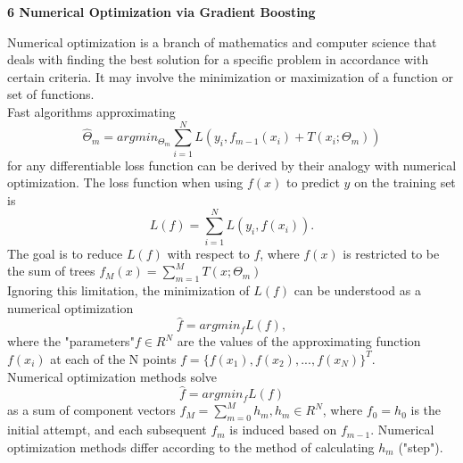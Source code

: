 \documentclass[12pt, letterpaper, twoside]{article}
\begin{document}
\begin{center}
\textbf{\large{6 Numerical Optimization via Gradient
Boosting}} 

\end{center}
\hspace*{4ex}Numerical optimization is a branch of mathematics and computer science that deals with finding the best solution for a specific problem in accordance with certain criteria. It may involve the minimization or maximization of a function or set of functions.\\
\hspace*{4ex}Fast algorithms approximating 
\begin{equation*}
\hat{\Theta}_{m}=argmin_{\Theta_{m}}\sum_{i=1}^N L(y_i,f_{m-1}(x_i)+T(x_i;\Theta_m))
\end{equation*}
for any differentiable loss function can be derived by their analogy with numerical optimization. The loss function when using $f(x)$ to predict $y$ on the training set is
\begin{equation*}
L(f)=\sum_{i=1}^N L(y_i,f(x_i)).
\end{equation*}
The goal is to reduce $L(f)$ with respect to $f$, where $f(x)$ is restricted to be the sum of trees $f_M(x)=\sum _{m=1}^M T(x;\Theta_m)$\\
\hspace*{4ex} Ignoring this limitation, the minimization of $L(f)$ can be understood as a numerical optimization
\begin{equation*}
\hat{f}=argmin_f L(f),
\end{equation*}
where the "parameters"\space $f \in R^N$ are the values of the approximating function $f(x_i)$ at each of the N points $f = \{f(x_1), f(x_2),...,f(x_N)\}^T$.\\
\hspace*{4ex} Numerical optimization methods solve
\begin{equation*}
\hat{f}=argmin_f L(f)
\end{equation*}
as a sum of component vectors $f_M=\sum_{m=0}^M h_m, h_m \in R^N$, where $f_0=h_0$ is the initial attempt, and each subsequent $f_m$ is induced based on $f_{m−1}$. Numerical optimization methods differ according to the method of calculating $h_m$ ("step").
\end{document}
